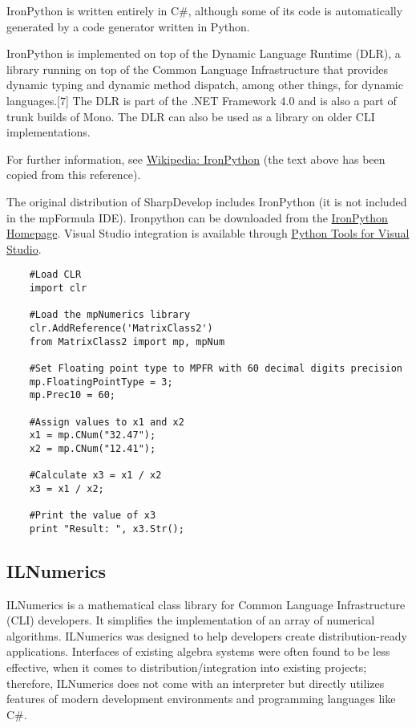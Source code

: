	IronPython is written entirely in C\#, although some of its code is automatically generated by a code generator written in Python.
	
	IronPython is implemented on top of the Dynamic Language Runtime (DLR), a library running on top of the Common Language Infrastructure that provides dynamic typing and dynamic method dispatch, among other things, for dynamic languages.[7] The DLR is part of the .NET Framework 4.0 and is also a part of trunk builds of Mono. The DLR can also be used as a library on older CLI implementations.
	
	For further information, see \href{http://en.wikipedia.org/wiki/IronPython}{Wikipedia: IronPython} (the text above has been copied from this reference).
	
	The original distribution of SharpDevelop includes IronPython (it is not included in the mpFormula IDE). Ironpython can be downloaded from the 
	\href{http://ironpython.net/}{IronPython Homepage}. Visual Studio integration is available through  \href{http://ironpython.net/tools/}{Python Tools for Visual Studio}.
	
	
	\begin{lstlisting}
	#Load CLR
	import clr
	
	#Load the mpNumerics library
	clr.AddReference('MatrixClass2')
	from MatrixClass2 import mp, mpNum
	
	#Set Floating point type to MPFR with 60 decimal digits precision
	mp.FloatingPointType = 3;
	mp.Prec10 = 60;
	
	#Assign values to x1 and x2
	x1 = mp.CNum("32.47");
	x2 = mp.CNum("12.41");
	
	#Calculate x3 = x1 / x2
	x3 = x1 / x2;
	
	#Print the value of x3
	print "Result: ", x3.Str();
	\end{lstlisting}
	
	
	
	
	
	
	
	\newpage
	\subsection{ILNumerics}
	\label{ILNumerics}
	
	ILNumerics is a mathematical class library for Common Language Infrastructure (CLI) developers. It simplifies the implementation of an array of numerical algorithms. ILNumerics was designed to help developers create distribution-ready applications. Interfaces of existing algebra systems were often found to be less effective, when it comes to distribution/integration into existing projects; therefore, ILNumerics does not come with an interpreter but directly utilizes features of modern development environments and programming languages like C\#.
	
